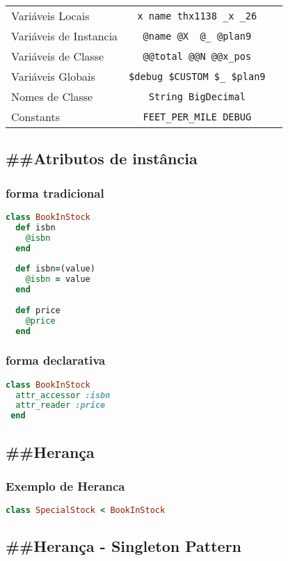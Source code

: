 \documentclass[serif,mathserif]{article}
\begin{document}
\begin{tabular}{ l | c | r }
Variáveis Locais & \verb|x name thx1138 _x _26| \\
Variáveis de Instancia & \verb|@name @X  @_ @plan9| \\
Variáveis de Classe & \verb|@@total @@N @@x_pos| \\
Variáveis Globais & \verb|$debug $CUSTOM $_ $plan9| \\
Nomes de Classe & \verb|String BigDecimal| \\
Constants & \verb|FEET_PER_MILE DEBUG|
\end{tabular}

\subsection{\#\#Atributos de instância}

\subsubsection{forma tradicional}
\begin{lstlisting}[language=ruby]
class BookInStock  
  def isbn
    @isbn
  end
 
  def isbn=(value)
    @isbn = value
  end
 
  def price
    @price
  end
\end{lstlisting}

\subsubsection{forma declarativa}
\begin{lstlisting}[language=ruby]
class BookInStock  
  attr_accessor :isbn
  attr_reader :price
 end

\end{lstlisting}

\subsection{\#\#Herança}
\subsubsection{Exemplo de Heranca}
\begin{lstlisting}[language=ruby]
class SpecialStock < BookInStock
\end{lstlisting}

\subsection{\#\#Herança - Singleton Pattern}
\end{document}
